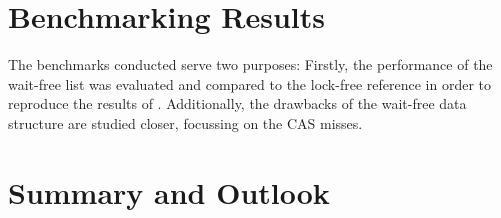 \documentclass[a4paper, 12pt]{article}
\begin{document}
\section{Benchmarking Results}

The benchmarks conducted serve two purposes: Firstly, the performance of the wait-free list was evaluated and compared to the lock-free reference in order to reproduce the results of \cite{timnat12}. Additionally, the drawbacks of the wait-free data structure are studied closer, focussing on the CAS misses. 











\section{Summary and Outlook}

\sloppy
\printbibliography
\end{document}
